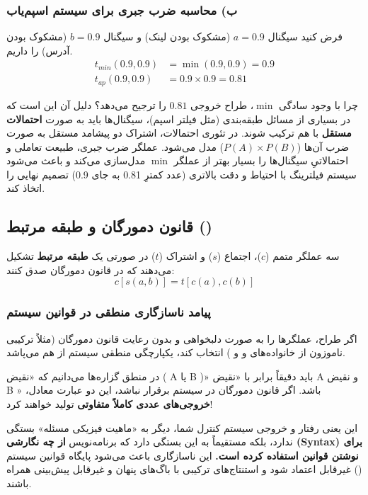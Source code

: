 \documentclass{article}
\begin{document}
\subsubsection*{ب) محاسبه ضرب جبری برای سیستم اسپم‌یاب}
فرض کنید سیگنال $a=0.9$ (مشکوک بودن لینک) و سیگنال $b=0.9$ (مشکوک بودن آدرس) را داریم.
\begin{align*}
	t_{min}(0.9, 0.9) &= \min(0.9, 0.9) = 0.9 \\
	t_{ap}(0.9, 0.9)  &= 0.9 \times 0.9 = 0.81
\end{align*}

\begin{tcolorbox}[
	colback=lightmutedpurple,
	colframe=mutedpurple,
	title=دلیل ترجیح عملگر ضرب جبری توسط طراح,
	fonttitle=\bfseries\large,
	coltitle=white
	]
	چرا با وجود سادگی $\min$، طراح خروجی $0.81$ را ترجیح می‌دهد؟ 
	دلیل آن این است که در بسیاری از مسائل طبقه‌بندی (مثل فیلتر اسپم)، سیگنال‌ها باید به صورت \textbf{احتمالات مستقل} با هم ترکیب شوند. در تئوری احتمالات، اشتراک دو پیشامد مستقل به صورت ضرب آن‌ها ($P(A) \times P(B)$) مدل می‌شود. عملگر ضرب جبری، طبیعت تعاملی و احتمالاتیِ سیگنال‌ها را بسیار بهتر از عملگر $\min$ مدل‌سازی می‌کند و باعث می‌شود سیستم فیلترینگ با احتیاط و دقت بالاتری (عدد کمترِ 0.81 به جای 0.9) تصمیم نهایی را اتخاذ کند.
\end{tcolorbox}

\subsection{قانون دمورگان و طبقه مرتبط ()}

سه عملگر متمم ($c$)، اجتماع ($s$) و اشتراک ($t$) در صورتی یک \textbf{طبقه مرتبط} تشکیل می‌دهند که در قانون دمورگان صدق کنند:
$$ c[s(a,b)] = t[c(a), c(b)] $$

\subsubsection*{پیامد ناسازگاری منطقی در قوانین سیستم}
اگر طراح، عملگرها را به صورت دلبخواهی و بدون رعایت قانون دمورگان (مثلاً ترکیبی ناموزون از خانواده‌های  و  و ) انتخاب کند، یکپارچگی منطقی سیستم از هم می‌پاشد.

\begin{tcolorbox}[
	colback=lightmutedgreen,
	colframe=mutedgreen,
	title=بروز فاجعه در استنتاج سیستم,
	coltitle=white
	]
	در منطق گزاره‌ها می‌دانیم که «نقیض ( A یا B )» باید دقیقاً برابر با «نقیض A و نقیض B » باشد. اگر قانون دمورگان در سیستم برقرار نباشد، این دو عبارت معادل، \textbf{خروجی‌های عددی کاملاً متفاوتی} تولید خواهند کرد!
	
	این یعنی رفتار و خروجی سیستم کنترل شما، دیگر به «ماهیت فیزیکی مسئله» بستگی ندارد، بلکه مستقیماً به این بستگی دارد که برنامه‌نویس \textbf{از چه نگارشی (Syntax) برای نوشتن قوانین  استفاده کرده است.} این ناسازگاری باعث می‌شود پایگاه قوانین سیستم () غیرقابل اعتماد شود و استنتاج‌های ترکیبی با باگ‌های پنهان و غیرقابل پیش‌بینی همراه باشند.
\end{tcolorbox}
\end{document}
